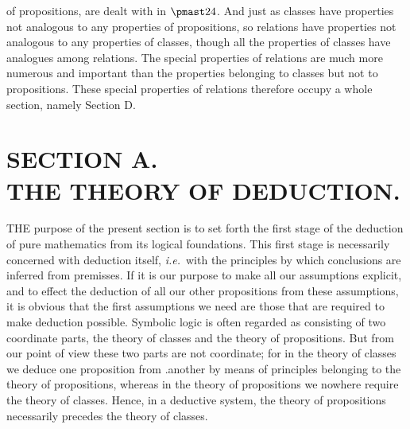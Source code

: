 \documentclass[letterpaper,12pt,openany,leqno]{book}
\newcommand{\pagefirst}[1]{\marginnote[\boxed{\text{#1}}]{\boxed{\text{#1}}}}
\begin{document}
of propositions, are dealt with in $\pmast24$. And just as classes have properties not analogous to any properties of propositions, so relations have properties not analogous to any properties of classes, though all the properties of classes have analogues among relations. The special properties of relations are much more numerous and important than the properties belonging to classes but not to propositions. These special properties of relations therefore occupy a whole section, namely Section D.

\chapter*{\centering SECTION A. \\ THE THEORY OF DEDUCTION.} \pagefirst{94} 

THE purpose of the present section is to set forth the first stage of the deduction of pure mathematics from its logical foundations. This first stage is necessarily concerned with deduction itself, \textit{i.e.}\ with the principles by which conclusions are inferred from premisses. If it is our purpose to make all our assumptions explicit, and to effect the deduction of all our other propositions from these assumptions, it is obvious that the first assumptions we need are those that are required to make deduction possible. Symbolic logic is often regarded as consisting of two coordinate parts, the theory of classes and the theory of propositions. But from our point of view these two parts are not coordinate; for in the theory of classes we deduce one proposition from .another by means of principles belonging to the theory of propositions, whereas in the theory of propositions we nowhere require the theory of classes. Hence, in a deductive system, the theory of propositions necessarily precedes the theory of classes.
\end{document}
